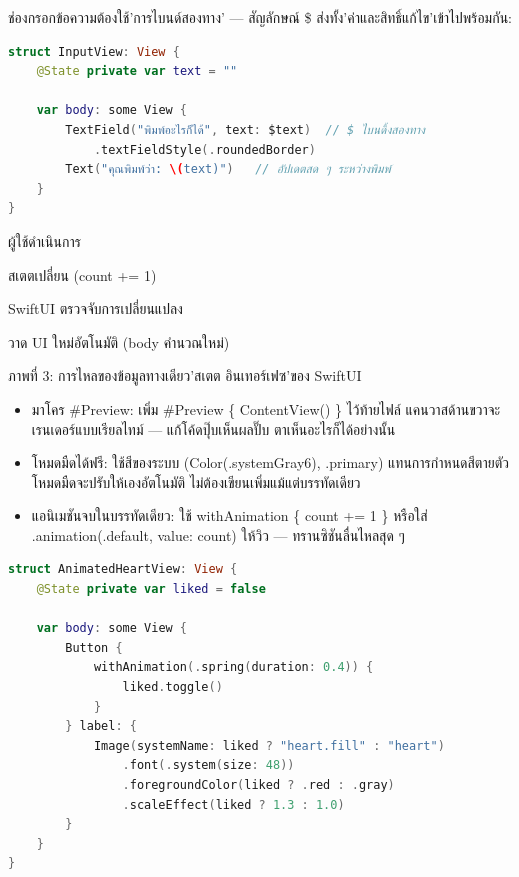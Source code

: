 ช่องกรอกข้อความต้องใช้'การไบนด์สองทาง' — สัญลักษณ์ \$ ส่งทั้ง'ค่าและสิทธิ์แก้ไข'เข้าไปพร้อมกัน:

\begin{lstlisting}[language=Swift]
struct InputView: View {
    @State private var text = ""

    var body: some View {
        TextField("พิมพ์อะไรก็ได้", text: $text)  // $ ไบนดิ้งสองทาง
            .textFieldStyle(.roundedBorder)
        Text("คุณพิมพ์ว่า: \(text)")   // อัปเดตสด ๆ ระหว่างพิมพ์
    }
}
\end{lstlisting}

ผู้ใช้ดำเนินการ

สเตตเปลี่ยน (count += 1)

SwiftUI ตรวจจับการเปลี่ยนแปลง

วาด UI ใหม่อัตโนมัติ (body คำนวณใหม่)

\begin{center}\small\color{gray}ภาพที่ 3: การไหลของข้อมูลทางเดียว'สเตต อินเทอร์เฟซ'ของ SwiftUI\end{center}


\begin{itemize}
  \item มาโคร \#Preview: เพิ่ม \#Preview \{ ContentView() \} ไว้ท้ายไฟล์ แคนวาสด้านขวาจะเรนเดอร์แบบเรียลไทม์ — แก้โค้ดปุ๊บเห็นผลปั๊บ ตาเห็นอะไรก็ได้อย่างนั้น
  \item โหมดมืดได้ฟรี: ใช้สีของระบบ (Color(.systemGray6), .primary) แทนการกำหนดสีตายตัว โหมดมืดจะปรับให้เองอัตโนมัติ ไม่ต้องเขียนเพิ่มแม้แต่บรรทัดเดียว
  \item แอนิเมชันจบในบรรทัดเดียว: ใช้ withAnimation \{ count += 1 \} หรือใส่ .animation(.default, value: count) ให้วิว — ทรานซิชันลื่นไหลสุด ๆ
\end{itemize}

\begin{lstlisting}[language=Swift]
struct AnimatedHeartView: View {
    @State private var liked = false

    var body: some View {
        Button {
            withAnimation(.spring(duration: 0.4)) {
                liked.toggle()
            }
        } label: {
            Image(systemName: liked ? "heart.fill" : "heart")
                .font(.system(size: 48))
                .foregroundColor(liked ? .red : .gray)
                .scaleEffect(liked ? 1.3 : 1.0)
        }
    }
}
\end{lstlisting}

